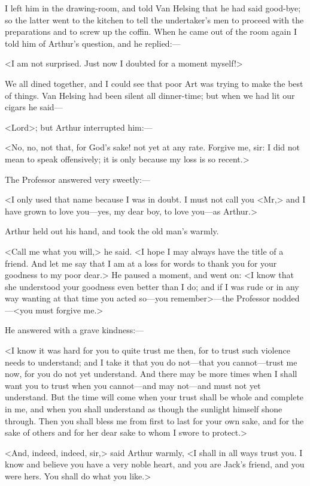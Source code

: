 I left him in the drawing-room, and told Van Helsing that he had said good-bye; so the latter went to the kitchen to tell the undertaker's men to proceed with the preparations and to screw up the coffin. When he came out of the room again I told him of Arthur's question, and he replied:—

<I am not surprised. Just now I doubted for a moment myself!>

We all dined together, and I could see that poor Art was trying to make the best of things. Van Helsing had been silent all dinner-time; but when we had lit our cigars he said—

<Lord\longdash>; but Arthur interrupted him:—

<No, no, not that, for God's sake! not yet at any rate. Forgive me, sir: I did not mean to speak offensively; it is only because my loss is so recent.>

The Professor answered very sweetly:—

<I only used that name because I was in doubt. I must not call you <Mr,> and I have grown to love you—yes, my dear boy, to love you—as Arthur.>

Arthur held out his hand, and took the old man's warmly.

<Call me what you will,> he said. <I hope I may always have the title of a friend. And let me say that I am at a loss for words to thank you for your goodness to my poor dear.> He paused a moment, and went on: <I know that she understood your goodness even better than I do; and if I was rude or in any way wanting at that time you acted so—you remember>—the Professor nodded—<you must forgive me.>

He answered with a grave kindness:—

<I know it was hard for you to quite trust me then, for to trust such violence needs to understand; and I take it that you do not—that you cannot—trust me now, for you do not yet understand. And there may be more times when I shall want you to trust when you cannot—and may not—and must not yet understand. But the time will come when your trust shall be whole and complete in me, and when you shall understand as though the sunlight himself shone through. Then you shall bless me from first to last for your own sake, and for the sake of others and for her dear sake to whom I swore to protect.>

<And, indeed, indeed, sir,> said Arthur warmly, <I shall in all ways trust you. I know and believe you have a very noble heart, and you are Jack's friend, and you were hers. You shall do what you like.>

